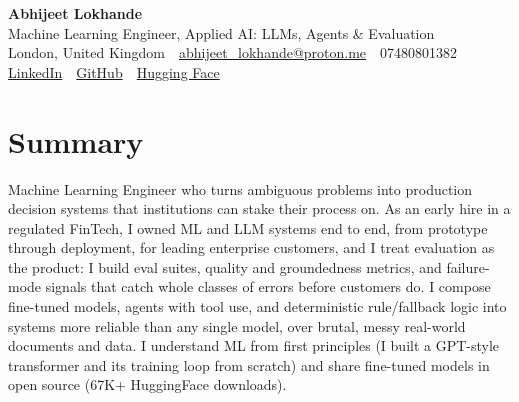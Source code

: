 \documentclass[10pt,a4paper]{article}
\newcommand{\sep}{\,\textcolor{accent!60}{\textbar}\,}
\begin{document}
\begin{center}
  {\fontsize{24}{26}\selectfont\bfseries Abhijeet Lokhande}\\[3pt]
  {\color{accent}\large Machine Learning Engineer, Applied AI: LLMs, Agents \& Evaluation}\\[5pt]
  {\small
    London, United Kingdom \sep
    \href{mailto:abhijeet_lokhande@proton.me}{abhijeet\_lokhande@proton.me} \sep
    07480801382 \\[2pt]
    \href{https://www.linkedin.com/in/ablds/}{LinkedIn} \sep
    \href{https://github.com/abhijeetscode}{GitHub} \sep
    \href{https://huggingface.co/ab-ai}{Hugging Face}
  }
\end{center}
\vspace{2pt}

\section{Summary}
Machine Learning Engineer who turns ambiguous problems into production decision systems that institutions can stake their process on. As an early hire in a regulated FinTech, I owned ML and LLM systems end to end, from prototype through deployment, for leading enterprise customers, and I treat evaluation as the product: I build eval suites, quality and groundedness metrics, and failure-mode signals that catch whole classes of errors before customers do. I compose fine-tuned models, agents with tool use, and deterministic rule/fallback logic into systems more reliable than any single model, over brutal, messy real-world documents and data. I understand ML from first principles (I built a GPT-style transformer and its training loop from scratch) and share fine-tuned models in open source (67K+ HuggingFace downloads).

\end{document}
